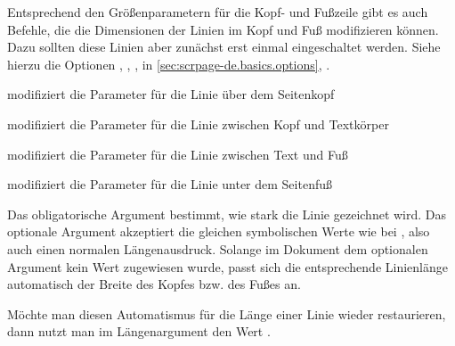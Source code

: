 \begin{Declaration}
\end{Declaration}%
Entsprechend den Größenparametern für die Kopf- und Fußzeile gibt es auch
Befehle, die die Dimensionen der Linien im Kopf und Fuß modifizieren
können. Dazu sollten diese Linien aber zunächst erst einmal eingeschaltet
werden. Siehe hierzu die Optionen , ,
,  in
\autoref{sec:scrpage-de.basics.options},
.

\begin{labeling}[\ --]{}
\item[\Macro{setheadtopline}] modifiziert die Parameter für die Linie
über dem Seitenkopf
\item[\Macro{setheadsepline}] modifiziert die Parameter für die Linie
zwischen Kopf und Textkörper
\item[\Macro{setfootsepline}] modifiziert die Parameter für die Linie
zwischen Text und Fuß
\item[\Macro{setfootbotline}] modifiziert die Parameter für die Linie
unter dem Seitenfuß
\end{labeling}

Das obligatorische Argument  bestimmt, wie stark die Linie
gezeichnet wird.  Das optionale Argument  akzeptiert die gleichen
symbolischen Werte wie  bei , also auch einen
normalen Längenausdruck.  Solange im Dokument dem optionalen Argument
 kein Wert zugewiesen wurde, passt sich die entsprechende
Linienlänge automatisch der Breite des Kopfes bzw. des Fußes an.

Möchte man diesen Automatismus für die Länge einer Linie wieder restaurieren,
dann nutzt man im Längenargument den Wert .

